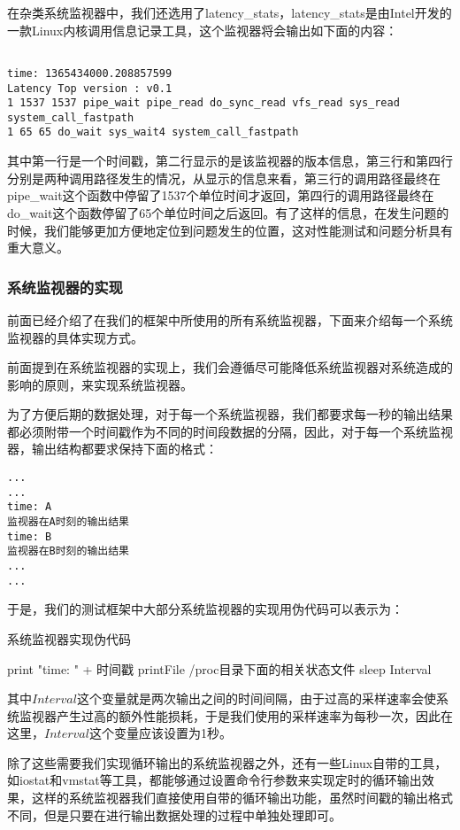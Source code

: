 在杂类系统监视器中，我们还选用了latency\_stats，latency\_stats是由Intel开发的一款Linux内核调用信息记录工具，这个监视器将会输出如下面的内容：
{
\footnotesize
\begin{verbatim}

time: 1365434000.208857599
Latency Top version : v0.1
1 1537 1537 pipe_wait pipe_read do_sync_read vfs_read sys_read system_call_fastpath
1 65 65 do_wait sys_wait4 system_call_fastpath
\end{verbatim}
}
其中第一行是一个时间戳，第二行显示的是该监视器的版本信息，第三行和第四行分别是两种调用路径发生的情况，从显示的信息来看，第三行的调用路径最终在pipe\_wait这个函数中停留了1537个单位时间才返回，第四行的调用路径最终在do\_wait这个函数停留了65个单位时间之后返回。有了这样的信息，在发生问题的时候，我们能够更加方便地定位到问题发生的位置，这对性能测试和问题分析具有重大意义。


\subsubsection{系统监视器的实现}
前面已经介绍了在我们的框架中所使用的所有系统监视器，下面来介绍每一个系统监视器的具体实现方式。

前面提到在系统监视器的实现上，我们会遵循尽可能降低系统监视器对系统造成的影响的原则，来实现系统监视器。

为了方便后期的数据处理，对于每一个系统监视器，我们都要求每一秒的输出结果都必须附带一个时间戳作为不同的时间段数据的分隔，因此，对于每一个系统监视器，输出结构都要求保持下面的格式：
\begin{verbatim}
...
...
time: A
监视器在A时刻的输出结果
time: B
监视器在B时刻的输出结果
...
...
\end{verbatim}

于是，我们的测试框架中大部分系统监视器的实现用伪代码可以表示为：


\begin{algorithm}
\caption{系统监视器实现伪代码}
{
     print "time: " + 时间戳\;
     printFile /proc目录下面的相关状态文件\;
     sleep Interval\;
}
\end{algorithm}



其中$Interval$这个变量就是两次输出之间的时间间隔，由于过高的采样速率会使系统监视器产生过高的额外性能损耗，于是我们使用的采样速率为每秒一次，因此在这里，$Interval$这个变量应该设置为1秒。

除了这些需要我们实现循环输出的系统监视器之外，还有一些Linux自带的工具，如iostat和vmstat等工具，都能够通过设置命令行参数来实现定时的循环输出效果，这样的系统监视器我们直接使用自带的循环输出功能，虽然时间戳的输出格式不同，但是只要在进行输出数据处理的过程中单独处理即可。

